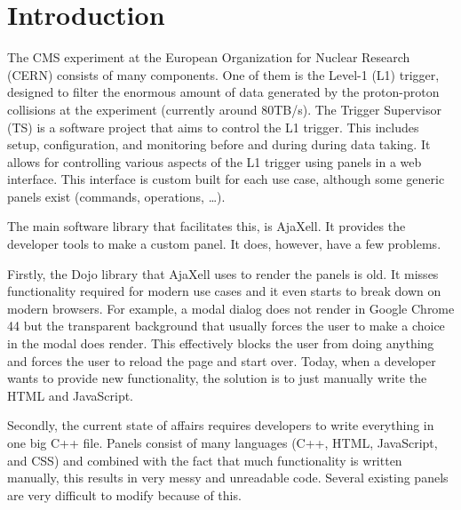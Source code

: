 \documentclass[journal]{IEEEtran}
\begin{document}
\IEEEpeerreviewmaketitle

\section{Introduction}

%
The CMS experiment at the European Organization for Nuclear Research (CERN)
consists of many components. One of them is the Level-1 (L1) trigger, designed to filter
the enormous amount of data generated by the proton-proton collisions at the
experiment (currently around 80TB/s\cite{CMS_Experiment2}).
The Trigger Supervisor (TS) is a software project that aims to control the L1 trigger.
This includes setup, configuration, and monitoring before and during during data
taking. It allows for controlling various aspects of the L1 trigger using panels
in a web interface. This interface is custom built for each use case, although
some generic panels exist (commands, operations, \ldots).

The main software library that facilitates this, is AjaXell. It provides the
developer tools to make a custom panel. It does, however, have a few problems.

Firstly, the Dojo library that AjaXell uses to render the panels is old. It
misses functionality required for modern use cases and it even starts to break
down on modern browsers. For example, a modal dialog does not render in Google
Chrome 44 but the transparent background that usually forces the user to make
a choice in the modal does render. This effectively blocks the user from doing
anything and forces the user to reload the page and start over.
Today, when a developer wants to provide new functionality, the solution is to
just manually write the HTML and JavaScript.

Secondly, the current state of affairs requires developers to write everything
in one big C++ file. Panels consist of many languages (C++, HTML, JavaScript,
and CSS) and combined with the fact that much functionality is written manually,
this results in very messy and unreadable code.
Several existing panels are very difficult to modify because of this.
\end{document}
